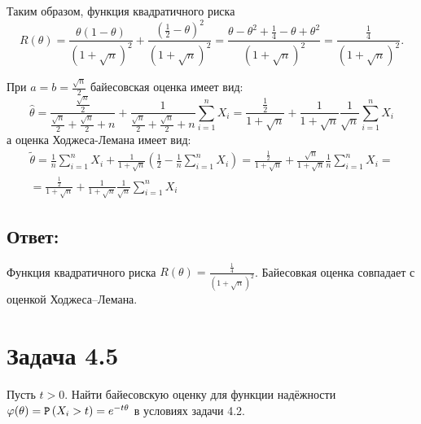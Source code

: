 \documentclass[12pt]{article}
\begin{document}
    Таким образом, функция квадратичного риска
    \[
        R(\theta)
        = \frac{\theta \left ( 1 - \theta \right )}{\left ( 1 + \sqrt{n} \right )^2}
        + \frac{\left ( \frac{1}{2} - \theta \right )^2}{\left ( 1 + \sqrt{n} \right )^2}
        = \frac{\theta - \theta^2 + \frac{1}{4} - \theta + \theta^2}{\left ( 1 + \sqrt{n} \right )^2}
        = \frac{\frac{1}{4}}{\left ( 1 + \sqrt{n} \right )^2} .
    \]

    При $a = b = \frac{\sqrt{n}}{2}$ байесовская оценка имеет вид:
    \[
        \widehat{\theta}
        = \frac{\frac{\sqrt{n}}{2}}{\frac{\sqrt{n}}{2} + \frac{\sqrt{n}}{2} + n} + \frac{1}{\frac{\sqrt{n}}{2} + \frac{\sqrt{n}}{2} + n} \sum_{i=1}^n X_i
        = \frac{\frac{1}{2}}{1 + \sqrt{n}} + \frac{1}{1 + \sqrt{n}} \frac{1}{\sqrt{n}} \sum_{i=1}^n X_i
    \]
    а оценка Ходжеса-Лемана имеет вид:
    \begin{multline*}
        \widetilde{\theta}
        = \frac{1}{n} \sum_{i=1}^n X_i + \frac{1}{1 + \sqrt{n}} \left ( \frac{1}{2} - \frac{1}{n} \sum_{i=1}^n X_i \right )
        = \frac{\frac{1}{2}}{1 + \sqrt{n}} + \frac{\sqrt{n}}{1 + \sqrt{n}} \frac{1}{n} \sum_{i=1}^n X_i = \\
        = \frac{\frac{1}{2}}{1 + \sqrt{n}} + \frac{1}{1 + \sqrt{n}} \frac{1}{\sqrt{n}} \sum_{i=1}^n X_i
    \end{multline*}

    \subsection*{Ответ:}
    Функция квадратичного риска $R(\theta) = \frac{\frac{1}{4}}{\left ( 1 + \sqrt{n} \right )^2}$. Байесовкая оценка совпадает с оценкой Ходжеса--Лемана.

    \section*{Задача 4.5}
    Пусть $t > 0 $. Найти байесовскую оценку для функции надёжности $\varphi(\theta) = \mathtt{P} \left ( X_i > t \right ) = e^{-t \theta}$ в условиях задачи 4.2.
\end{document}
